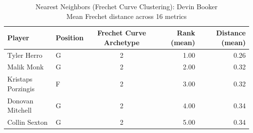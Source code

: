 \begin{table}[t]
\caption*{
{\fontsize{20}{25} Nearest Neighbors (Frechet Curve Clustering): Devin Booker\fontsize{12}{15}\selectfont } \\ 
{\fontsize{14}{17}\selectfont  Mean Frechet distance across 16 metrics\fontsize{12}{15}\selectfont }
} 
\fontsize{12.0pt}{14.0pt}\selectfont
\begin{tabular*}{\linewidth}{@{\extracolsep{\fill}}llcrr}
\toprule
Player & Position & Frechet Curve Archetype & Rank (mean) & Distance (mean) \\ 
\midrule\addlinespace[2.5pt]
Tyler Herro & G & 2 & 1.00 & 0.26 \\ 
Malik Monk & G & 2 & 2.00 & 0.32 \\ 
Kristaps Porzingis & F & 2 & 3.00 & 0.32 \\ 
Donovan Mitchell & G & 2 & 4.00 & 0.34 \\ 
Collin Sexton & G & 2 & 5.00 & 0.34 \\ 
\bottomrule
\end{tabular*}
\end{table}

